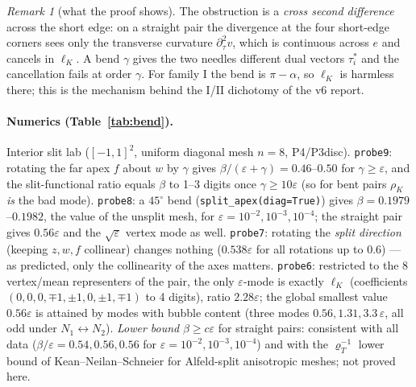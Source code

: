 \documentclass[11pt]{article}
\theoremstyle{remark}
\newtheorem{remark}[theorem]{Remark}
\begin{document}
\begin{remark}[what the proof shows]
The obstruction is a \emph{cross second difference} across the short edge: on a straight pair the divergence at the four short-edge
corners sees only the transverse curvature $\partial_\tau^2v$, which is continuous across $e$ and cancels in $\ell_K$. A bend
$\gamma$ gives the two needles different dual vectors $\tau_i^*$ and the cancellation fails at order $\gamma$. For family I the bend is $\pi-\alpha$, so
$\ell_K$ is harmless there; this is the mechanism behind the I/II dichotomy of the v6 report.
\end{remark}
\paragraph{Numerics (Table~\ref{tab:bend}).} Interior slit lab ($[-1,1]^2$, uniform diagonal mesh $n=8$, P4/P3disc).
\texttt{probe9}: rotating the far apex $f$ about $w$ by $\gamma$ gives $\beta/(\varepsilon+\gamma)=0.46$--$0.50$ for $\gamma\ge\varepsilon$, and the slit-functional
ratio equals $\beta$ to 1--3 digits once $\gamma\ge10\varepsilon$ (so for bent pairs $\rho_K$ \emph{is} the bad mode).
\texttt{probe8}: a $45^\circ$ bend (\texttt{split\_apex(diag=True)}) gives $\beta=0.1979$--$0.1982$, the value of the unsplit mesh, for
$\varepsilon=10^{-2},10^{-3},10^{-4}$; the straight pair gives $0.56\varepsilon$ and the $\sqrt\varepsilon$ vertex mode as well.
\texttt{probe7}: rotating the \emph{split direction} (keeping $z,w,f$ collinear) changes nothing ($0.538\varepsilon$ for all rotations up to $0.6$) --- as
predicted, only the collinearity of the axes matters. \texttt{probe6}: restricted to the 8 vertex/mean representers of the pair, the only
$\varepsilon$-mode is exactly $\ell_K$ (coefficients $(0,0,0,\mp1,\pm1,0,\pm1,\mp1)$ to 4 digits), ratio $2.28\varepsilon$; the global
smallest value $0.56\varepsilon$ is attained by modes with bubble content (three modes $0.56,1.31,3.3\,\varepsilon$, all odd under $N_1\leftrightarrow N_2$).
\emph{Lower bound} $\beta\ge c\varepsilon$ for straight pairs: consistent with all data ($\beta/\varepsilon=0.54,0.56,0.56$ for
$\varepsilon=10^{-2},10^{-3},10^{-4}$) and with the $\varrho_T^{-1}$ lower bound of Kean--Neilan--Schneier for Alfeld-split anisotropic meshes; not proved here.
\end{document}
